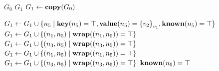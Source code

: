 \documentclass[]{article}
\begin{document}
\begin{algorithm}
    \caption{Wrap}
    \begin{algorithmic}
        \Require $G_0$
        \Ensure $G_1$
        \State $G_1 \gets \textbf{copy}(G_0)$



        \State $G_1 \gets G_1 \cup \{ n_5 \mid \textbf{key}(n_5) = \top, \textbf{value}(n_5) = {\{v_2\}}_{v_1}, \textbf{known}(n_5) = \top \}$
        \State $G_1 \gets G_1 \cup \{ (n_1,n_5) \mid \textbf{wrap}((n_1,n_5)) = \top \}$
        \State $G_1 \gets G_1 \cup \{ (n_3,n_5) \mid \textbf{wrap}((n_3,n_5)) = \top \}$
        \Else
        \State $G_1 \gets G_1 \cup \{ (n_1,n_5) \mid \textbf{wrap}((n_1,n_5)) = \top \}$
        \State $G_1 \gets G_1 \cup \{ (n_3,n_5) \mid \textbf{wrap}((n_3,n_5)) = \top \}$
        \EndIf
        \State $\textbf{known}(n_5) = \top$
        \EndIf
        \EndIf
        \EndFor
        \EndFor
    \end{algorithmic}
\end{algorithm}
\end{document}
